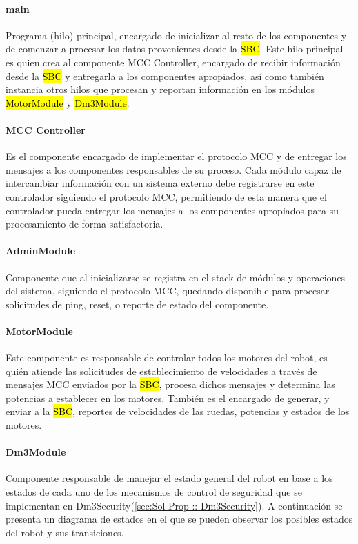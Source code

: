 \documentclass[withindex,glossary]{cam-thesis}
\begin{document}
\paragraph{main}
Programa (hilo) principal, encargado de inicializar al resto de los componentes y de comenzar a procesar los datos provenientes desde la \hl{SBC}. Este hilo principal es quien crea al componente MCC Controller, encargado de recibir información desde la \hl{SBC} y entregarla a los componentes apropiados, así como también instancia otros hilos que procesan y reportan información en los módulos \hl{MotorModule} y \hl{Dm3Module}.

\paragraph{MCC Controller}
Es el componente encargado de implementar el protocolo MCC y de entregar los mensajes a los componentes responsables de su proceso. Cada módulo capaz de intercambiar información con un sistema externo debe registrarse en este controlador siguiendo el protocolo MCC, permitiendo de esta manera que el controlador pueda entregar los mensajes a los componentes apropiados para su procesamiento de forma satisfactoria.

\paragraph{AdminModule}
Componente que al inicializarse se registra en el stack de módulos y operaciones del sistema, siguiendo el protocolo MCC, quedando disponible para procesar solicitudes de ping, reset, o reporte de estado del componente.

\paragraph{MotorModule}
Este componente es responsable de controlar todos los motores del robot, es quién atiende las solicitudes de establecimiento de velocidades a través de mensajes MCC enviados por la \hl{SBC}, procesa dichos mensajes y determina las potencias a establecer en los motores. También es el encargado de generar, y enviar a la \hl{SBC}, reportes de velocidades de las ruedas, potencias y estados de los motores.

\paragraph{Dm3Module} \label{Sol Prop :: Dm3Module}
Componente responsable de manejar el estado general del robot en base a los estados de cada uno de los mecanismos de control de seguridad que se implementan en Dm3Security(\ref{sec:Sol Prop :: Dm3Security}). A continuación se presenta un diagrama de estados en el que se pueden observar los posibles estados del robot y sus transiciones.
\end{document}
